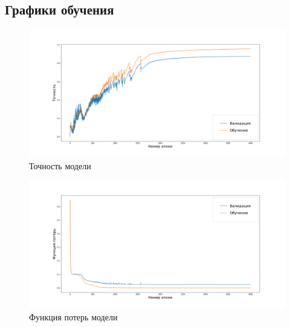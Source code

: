 \subsection{Графики обучения}\label{subsec:learning_figures}

\begin{figure}[h]
    \centering
    \includegraphics[scale=0.4]{model_accuracy}
    \caption{Точность модели}
    \label{fig:accuracy}
\end{figure}

\begin{figure}[h]
    \centering
    \includegraphics[scale=0.4]{model_loss}
    \caption{Функция потерь модели}
    \label{fig:loss}
\end{figure}

\newpage
